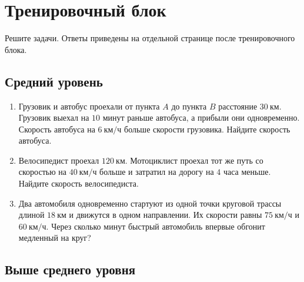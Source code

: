\documentclass[a4paper,12pt]{article}
\newcommand{\kmh}{\text{км/ч}}
\newcommand{\km}{\text{км}}
\begin{document}
\newpage

\section{Тренировочный блок}

Решите задачи. Ответы приведены на отдельной странице после тренировочного блока.

\subsection*{Средний уровень}

\begin{enumerate}
    \item Грузовик и автобус проехали от пункта $A$ до пункта $B$ расстояние $30\ \km$. Грузовик выехал на $10$ минут раньше автобуса, а прибыли они одновременно. Скорость автобуса на $6\ \kmh$ больше скорости грузовика. Найдите скорость автобуса.

    \item Велосипедист проехал $120\ \km$. Мотоциклист проехал тот же путь со скоростью на $40\ \kmh$ больше и затратил на дорогу на $4$ часа меньше. Найдите скорость велосипедиста.

    \item Два автомобиля одновременно стартуют из одной точки круговой трассы длиной $18\ \km$ и движутся в одном направлении. Их скорости равны $75\ \kmh$ и $60\ \kmh$. Через сколько минут быстрый автомобиль впервые обгонит медленный на круг?
\end{enumerate}

\subsection*{Выше среднего уровня}
\end{document}

